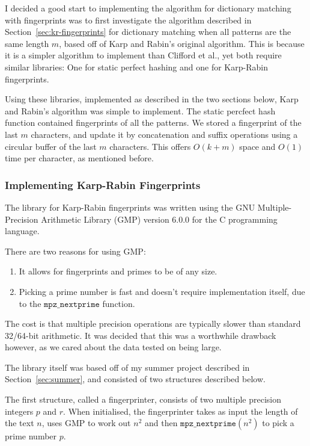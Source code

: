 \documentclass[ %
                    author={Dominic Joseph Moylett},
                    degree={MEng},
                     title={Dictionary Matching with Fingerprints},
                  subtitle={An Empirical Analysis},
                      type={Research},
                      year={2014} ]{dissertation}
\begin{document}
I decided a good start to implementing the algorithm for dictionary matching with fingerprints was to first investigate the algorithm described in Section~\ref{sec:kr-fingerprints} for dictionary matching when all patterns are the same length $m$, based off of Karp and Rabin's original algorithm. This is because it is a simpler algorithm to implement than Clifford et al., yet both require similar libraries: One for static perfect hashing and one for Karp-Rabin fingerprints.

Using these libraries, implemented as described in the two sections below, Karp and Rabin's algorithm was simple to implement. The static percfect hash function contained fingerprints of all the patterns. We stored a fingerprint of the last $m$ characters, and update it by concatenation and suffix operations using a circular buffer of the last $m$ characters. This offers $O(k + m)$ space and $O(1)$ time per character, as mentioned before.

\subsubsection{Implementing Karp-Rabin Fingerprints}

The library for Karp-Rabin fingerprints was written using the GNU Multiple-Precision Arithmetic Library (GMP) version 6.0.0 for the C programming language.

There are two reasons for using GMP:
\begin{enumerate}
  \item It allows for fingerprints and primes to be of any size.
  \item Picking a prime number is fast and doesn't require implementation itself, due to the $\texttt{mpz\_nextprime}$ function.
\end{enumerate}

The cost is that multiple precision operations are typically slower than standard 32/64-bit arithmetic. It was decided that this was a worthwhile drawback however, as we cared about the data tested on being large.

The library itself was based off of my summer project described in Section~\ref{sec:summer}, and consisted of two structures described below.

The first structure, called a fingerprinter, consists of two multiple precision integers $p$ and $r$. When initialised, the fingerprinter takes as input the length of the text $n$, uses GMP to work out $n^2$ and then $\texttt{mpz\_nextprime}(n^2)$ to pick a prime number $p$.
\end{document}
